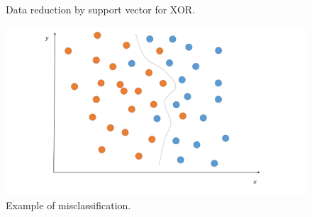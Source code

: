 \begin{figure}[t]
  \begin{center}
  \end{center}
  \caption{Data reduction by support vector for XOR.}
\vspace*{-3pt}
\end{figure}

\begin{figure}[t]
\begin{center}
\includegraphics[width=0.8\linewidth]{fig/dist2.pdf}
\end{center}
\caption{Example of misclassification.}
\vspace*{-3pt}
\end{figure}

